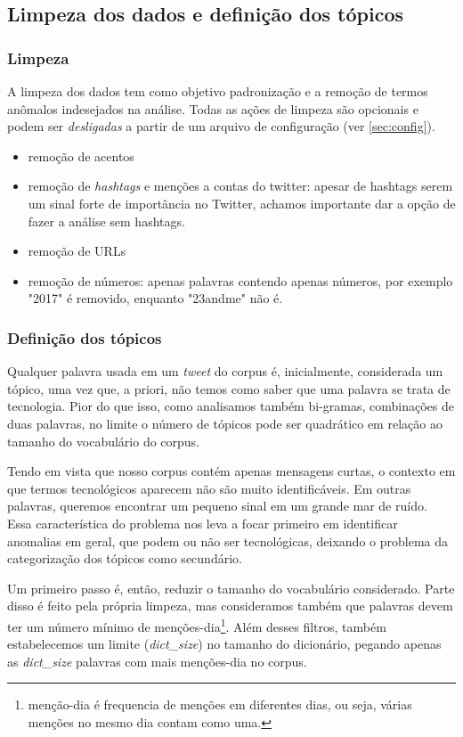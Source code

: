 \documentclass[paper=a4, fontsize=11pt]{scrartcl}
\numberwithin{equation}{section}		%
\numberwithin{figure}{section}			%
\numberwithin{table}{section}				%
\begin{document}
\subsection{Limpeza dos dados e definição dos tópicos}
\subsubsection{Limpeza}
A limpeza dos dados tem como objetivo padronização e a remoção de termos anômalos indesejados na análise. Todas as ações de limpeza são opcionais e podem ser \emph{desligadas} a partir de um arquivo de configuração (ver \ref{sec:config}).
\begin{itemize}
	\item  remoção de acentos
	\item  remoção de \emph{hashtags} e menções a contas do twitter: apesar de hashtags serem um sinal forte de importância no Twitter, achamos importante dar a opção de fazer a análise sem hashtags.
	\item  remoção de URLs
	\item  remoção de números: apenas palavras contendo apenas números, por exemplo "2017" é removido, enquanto "23andme" não é.
\end{itemize}
\subsubsection{Definição dos tópicos}
Qualquer palavra usada em um \emph{tweet} do corpus é, inicialmente, considerada um tópico, uma vez que, a priori, não temos como saber que uma palavra se trata de tecnologia. Pior do que isso, como analisamos também bi-gramas, combinações de duas palavras, no limite o número de tópicos pode ser quadrático em relação ao tamanho do vocabulário do corpus.

Tendo em vista que nosso corpus contém apenas mensagens curtas, o contexto em que termos tecnológicos aparecem não são muito identificáveis. Em outras palavras, queremos encontrar um pequeno sinal em um grande mar de ruído. Essa característica do problema nos leva a focar primeiro em identificar anomalias em geral, que podem ou não ser tecnológicas, deixando o problema da categorização dos tópicos como secundário.

Um primeiro passo é, então, reduzir o tamanho do vocabulário considerado. Parte disso é feito pela própria limpeza, mas consideramos também que palavras devem ter um número mínimo de menções-dia\footnote{menção-dia é frequencia de menções em diferentes dias, ou seja, várias menções no mesmo dia contam como uma.}. Além desses filtros, também estabelecemos um limite (\emph{dict\_size}) no tamanho do dicionário, pegando apenas as \emph{dict\_size} palavras com mais menções-dia no corpus.
\end{document}
